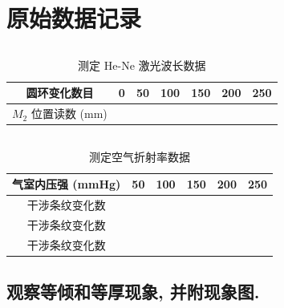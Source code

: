 \documentclass[signature=data]{physicsreport}
\begin{document}
\section{原始数据记录}
\subsection{}
\begin{table}[H]
    \caption{测定 He-Ne 激光波长数据} \label{tab:1}
    \centering
    \begin{tabularx}{\textwidth}{|c|Y|Y|Y|Y|Y|Y|} \hline
        圆环变化数目          & 0 & 50 & 100 & 150 & 200 & 250 \\\hline
        $M_2$ 位置读数 (mm) &   &    &     &     &     &     \\\hline
    \end{tabularx}
\end{table}

\subsection{}
\begin{table}[H]
    \caption{测定空气折射率数据} \label{tab:2}
    \centering
    \begin{tabularx}{\textwidth}{|c|Y|Y|Y|Y|Y|} \hline
        气室内压强 (mmHg) & 50 & 100 & 150 & 200 & 250 \\\hline
        干涉条纹变化数      &    &     &     &     &     \\\hline
        干涉条纹变化数      &    &     &     &     &     \\\hline
        干涉条纹变化数      &    &     &     &     &     \\\hline
    \end{tabularx}
\end{table}

\subsection{观察等倾和等厚现象, 并附现象图.}

\makeatletter
{}
\makeatother

\newpage
\end{document}
